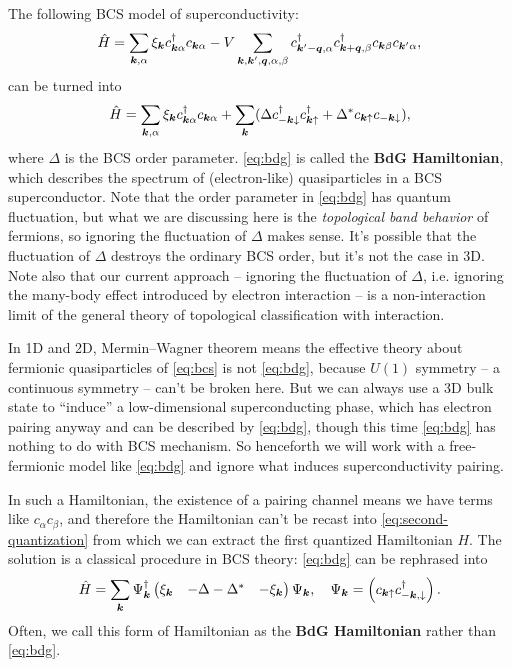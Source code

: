 \documentclass[hyperref, a4paper]{article}
\newcommand*{\concept}[1]{{\textbf{#1}}}
\def\\{}%
\begin{document}
The following BCS model of superconductivity:
\begin{equation}
    \hat{H} = \sum_{\vb*{k}, \alpha} \xi_{\vb*{k}} c^\dagger_{\vb*{k} \alpha} c_{\vb*{k} \alpha} - V \sum_{\vb*{k}, \vb*{k}', \vb*{q}, \alpha, \beta} c^\dagger_{\vb*{k}' - \vb*{q}, \alpha} c^\dagger_{\vb*{k} + \vb*{q}, \beta} c_{\vb*{k} \beta} c_{\vb*{k}' \alpha},
    \label{eq:bcs}
\end{equation}
can be turned into 
\begin{equation}
    \hat{H} = \sum_{\vb*{k}, \alpha} \xi_{\vb*{k}} c^\dagger_{\vb*{k} \alpha} c_{\vb*{k} \alpha} 
    + \sum_{\vb*{k}} (\Delta c^\dagger_{- \vb*{k} \downarrow} c^\dagger_{\vb*{k} \uparrow} + \Delta^* c_{\vb*{k} \uparrow} c_{- \vb*{k} \downarrow}),
    \label{eq:bdg}
\end{equation}
where $\Delta$ is the BCS order parameter. \eqref{eq:bdg} is called the \concept{BdG Hamiltonian}, 
which describes the spectrum of (electron-like) quasiparticles in a BCS superconductor. Note that 
the order parameter in \eqref{eq:bdg} has quantum fluctuation, but what we are discussing here is 
the \emph{topological band behavior} of fermions, so ignoring the fluctuation of $\Delta$ makes sense.
It's possible that the fluctuation of $\Delta$ destroys the ordinary BCS order, but it's not the case 
in 3D. Note also that our current approach -- ignoring the fluctuation of $\Delta$, i.e. ignoring the 
many-body effect introduced by electron interaction -- is a non-interaction limit of the general theory 
of topological classification with interaction. 

In 1D and 2D, Mermin–Wagner theorem means the 
effective theory about fermionic quasiparticles of \eqref{eq:bcs} is not \eqref{eq:bdg}, because 
$U(1)$ symmetry -- a continuous symmetry -- can't be broken here. But we can always use a 
3D bulk state to ``induce'' a low-dimensional superconducting phase, which has electron pairing anyway
and can be described by \eqref{eq:bdg}, though this time \eqref{eq:bdg} has nothing to do with BCS mechanism.
So henceforth we will work with a free-fermionic model like \eqref{eq:bdg} and ignore what induces superconductivity
pairing. 

In such a Hamiltonian, the existence of a pairing channel means we have terms like $c_\alpha c_\beta$,
and therefore the Hamiltonian can't be recast into \eqref{eq:second-quantization} from which we can extract 
the first quantized Hamiltonian $H$. The solution is a classical procedure in BCS theory: \eqref{eq:bdg} can be rephrased into 
\begin{equation}
    \hat{H} = \sum_{\vb*{k}} \Psi_{\vb*{k}}^\dagger \pmqty{ \xi_{\vb*{k}} & - \Delta \\ - \Delta^* & -\xi_{\vb*{k}} } \Psi_{\vb*{k}}, \quad \Psi_{\vb*{k}} = \pmqty{c_{\vb*{k} \uparrow} \\ c^\dagger_{- \vb*{k}, \downarrow}}.
\end{equation}
Often, we call this form of Hamiltonian as the \concept{BdG Hamiltonian} rather than \eqref{eq:bdg}.
\end{document}
